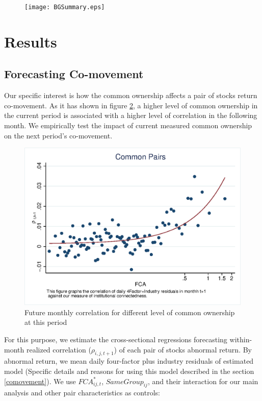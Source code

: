 \documentclass[12pt, a4paper]{article}
\begin{document}
\begin{figure}[htbp]
	\caption{}
	\label{BGSummary}
	\centering
	\texttt{[image: BGSummary.eps]}
\end{figure}
\FloatBarrier




\section{Results}

\subsection{Forecasting Co-movement}

Our specific interest is how the common ownership affects a pair of stocks return co-movement. As it has shown in figure \ref{mcorr50}, a higher level of common ownership in the current period is associated with a higher level of correlation in the following month. We empirically test the impact of current measured common ownership on the next period's co-movement.

 \begin{figure}[htbp]
 \centering  
        \centering
        \includegraphics[width=0.75\linewidth]{"mcorr50.eps"} 
    \caption{Future monthly correlation for different level of common ownership at this period }
    \label{mcorr50}
\end{figure}

For this purpose, we estimate the cross-sectional regressions forecasting within-month realized correlation ($\rho_{i,j,t+1}$) of each pair of stocks abnormal return. By abnormal return, we mean daily four-factor plus industry residuals of estimated model (Specific details and reasons for using this model described in the section \ref{comovement}). We use $\textit{FCA}^*_{ij,t}$, $\textit{SameGroup}_{ij} $, and their interaction for our main analysis and other pair characteristics as controls:

\end{document}

